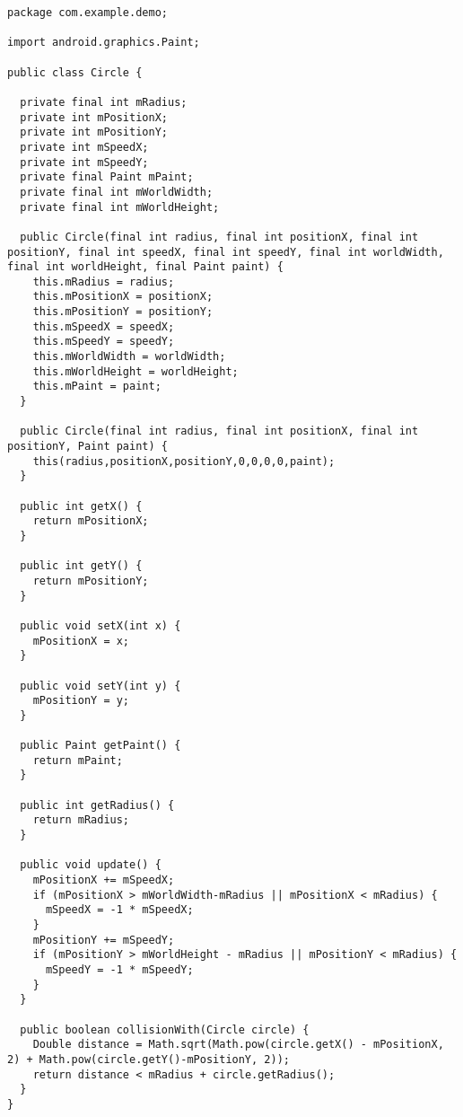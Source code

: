 \begin{lstlisting}[caption=Circle.java]
package com.example.demo;

import android.graphics.Paint;

public class Circle {

  private final int mRadius;
  private int mPositionX;
  private int mPositionY;
  private int mSpeedX;
  private int mSpeedY;
  private final Paint mPaint;
  private final int mWorldWidth;
  private final int mWorldHeight;

  public Circle(final int radius, final int positionX, final int positionY, final int speedX, final int speedY, final int worldWidth, final int worldHeight, final Paint paint) {
    this.mRadius = radius;
    this.mPositionX = positionX;
    this.mPositionY = positionY;
    this.mSpeedX = speedX;
    this.mSpeedY = speedY;
    this.mWorldWidth = worldWidth;
    this.mWorldHeight = worldHeight;
    this.mPaint = paint;
  }
	
  public Circle(final int radius, final int positionX, final int positionY, Paint paint) {
    this(radius,positionX,positionY,0,0,0,0,paint);
  }
	
  public int getX() {
    return mPositionX;
  }

  public int getY() {
    return mPositionY;
  }
	
  public void setX(int x) {
    mPositionX = x;
  }
	
  public void setY(int y) {
    mPositionY = y;
  }
	
  public Paint getPaint() {
    return mPaint;
  }
	
  public int getRadius() {
    return mRadius;
  }
	
  public void update() {
    mPositionX += mSpeedX;
    if (mPositionX > mWorldWidth-mRadius || mPositionX < mRadius) {
      mSpeedX = -1 * mSpeedX;
    }
    mPositionY += mSpeedY;
    if (mPositionY > mWorldHeight - mRadius || mPositionY < mRadius) {
      mSpeedY = -1 * mSpeedY;
    }
  }
	
  public boolean collisionWith(Circle circle) {
    Double distance = Math.sqrt(Math.pow(circle.getX() - mPositionX, 2) + Math.pow(circle.getY()-mPositionY, 2));
    return distance < mRadius + circle.getRadius();
  }
}
\end{lstlisting}

